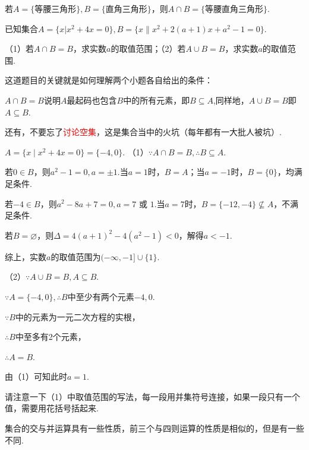 \documentclass[lang=cn,math=cm,chinesefont=nofont,11pt,scheme=chinese,twocol]{elegantbook}
\begin{document}
\begin{example}
  若$A=\{\text{等腰三角形}\},B=\{\text{直角三角形}\}$，则$A\cap B=\{\text{等腰直角三角形}\}.$
\end{example}

\begin{example}
  已知集合$A=\{x|x^{2}+4x=0\},B=\{x\|x^{2}+2(a+1)x+a^{2}-1=0\}.$

  （1）若$A\cap B=B$，求实数$a$的取值范围；（2）若$A\cup B=B$，求实数$a$的取值范围.
\end{example}
\begin{remark}
  这道题目的关键就是如何理解两个小题各自给出的条件：

  $A\cap B=B$说明$A$最起码也包含$B$中的所有元素，即$B\subseteq A$,同样地，$A\cup B=B$即$A\subseteq B$.

  还有，不要忘了\textcolor{red}{讨论空集}，这是集合当中的火坑（每年都有一大批人被坑）.
\end{remark}
\begin{solution}
  $A=\{x\mid x^{2}+4x=0\}=\{-4,0\}.$
  （1）$\because A\cap B=B,$\enspace$\therefore B\subseteq A.$
  
  若$0\in B$，则$a^2-1=0,a=\pm 1.$当$a=1$时，$B=A$；当$a=-1$时，$B=\{0\}$，均满足条件.

  若$-4\in B$，则$a^2-8a+7=0,a=7\text{ 或 }1.$当$a=7$时，$B=\{-12,-4\}\nsubseteq A$，不满足条件.

  若$B=\varnothing$，则$\Delta=4(a+1)^{2}-4(a^{2}-1)<0$，解得$a<-1$.

  综上，实数$a$的取值范围为$(-\infty,-1]\cup\{1\}.$

  （2）$\because A\cup B=B,$\enspace$A\subseteq B.$

  $\because A=\{-4,0\},$\enspace$\therefore B$中至少有两个元素$-4,0.$

  $\because B$中的元素为一元二次方程的实根，

  $\therefore B$中至多有2个元素，

  $\therefore A=B.$

  由（1）可知此时$a=1$.
\end{solution}
\begin{remark}
  请注意一下（1）中取值范围的写法，每一段用并集符号连接，如果一段只有一个值，需要用花括号括起来.
\end{remark}

\hspace*{\fill}

集合的交与并运算具有一些性质，前三个与四则运算的性质是相似的，但是有一些不同.
\end{document}
